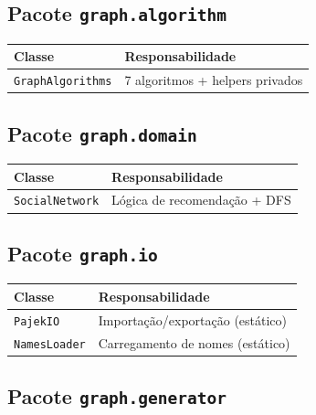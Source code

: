 \documentclass[12pt,a4paper]{article}
\begin{document}
    \subsection{Pacote \texttt{graph.algorithm}}

    \begin{table}[h]
        \centering
        \begin{tabular}{|l|l|}
            \hline
            \textbf{Classe} & \textbf{Responsabilidade} \\
            \hline
            \texttt{GraphAlgorithms} & 7 algoritmos + helpers privados \\
            \hline
        \end{tabular}
    \end{table}

    \subsection{Pacote \texttt{graph.domain}}

    \begin{table}[h]
        \centering
        \begin{tabular}{|l|l|}
            \hline
            \textbf{Classe} & \textbf{Responsabilidade} \\
            \hline
            \texttt{SocialNetwork} & Lógica de recomendação + DFS \\
            \hline
        \end{tabular}
    \end{table}

    \subsection{Pacote \texttt{graph.io}}

    \begin{table}[h]
        \centering
        \begin{tabular}{|l|l|}
            \hline
            \textbf{Classe} & \textbf{Responsabilidade} \\
            \hline
            \texttt{PajekIO} & Importação/exportação (estático) \\
            \hline
            \texttt{NamesLoader} & Carregamento de nomes (estático) \\
            \hline
        \end{tabular}
    \end{table}

    \subsection{Pacote \texttt{graph.generator}}
\end{document}

